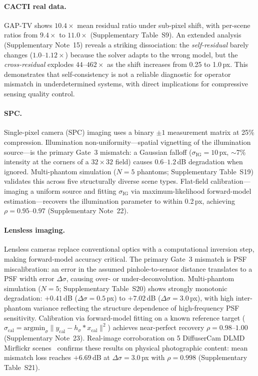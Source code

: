\documentclass[11pt]{article}
\newcommand{\recoveryratio}{\rho}
\begin{document}
\paragraph{CACTI real data.}
GAP-TV shows $10.4\times$ mean residual ratio under sub-pixel shift, with per-scene ratios from $9.4\times$ to $11.0\times$ (Supplementary Table~S9). An extended analysis (Supplementary Note~15) reveals a striking dissociation: the \emph{self-residual} barely changes ($1.0$--$1.12\times$) because the solver adapts to the wrong model, but the \emph{cross-residual} explodes $44$--$462\times$ as the shift increases from 0.25 to 1.0\,px. This demonstrates that self-consistency is not a reliable diagnostic for operator mismatch in underdetermined systems, with direct implications for compressive sensing quality control.

\paragraph{SPC.}
Single-pixel camera (SPC) imaging uses a binary $\pm 1$ measurement matrix at 25\% compression. Illumination non-uniformity---spatial vignetting of the illumination source---is the primary Gate~3 mismatch: a Gaussian falloff ($\sigma_\mathrm{IG}{=}10$\,px, $\sim$7\% intensity at the corners of a $32{\times}32$ field) causes $0.6$--$1.2$\,dB degradation when ignored. Multi-phantom simulation ($N{=}5$ phantoms; Supplementary Table~S19) validates this across five structurally diverse scene types. Flat-field calibration---imaging a uniform source and fitting $\sigma_\mathrm{IG}$ via maximum-likelihood forward-model estimation---recovers the illumination parameter to within 0.2\,px, achieving $\recoveryratio{=}0.95$--$0.97$ (Supplementary Note~22).

\paragraph{Lensless imaging.}
Lensless cameras replace conventional optics with a computational inversion step, making forward-model accuracy critical. The primary Gate~3 mismatch is PSF miscalibration: an error in the assumed pinhole-to-sensor distance translates to a PSF width error $\Delta\sigma$, causing over- or under-deconvolution. Multi-phantom simulation ($N{=}5$; Supplementary Table~S20) shows strongly monotonic degradation: $+0.41$\,dB ($\Delta\sigma{=}0.5$\,px) to $+7.02$\,dB ($\Delta\sigma{=}3.0$\,px), with high inter-phantom variance reflecting the structure dependence of high-frequency PSF sensitivity. Calibration via forward-model fitting on a known reference target ($\sigma_\mathrm{cal} = \mathrm{argmin}_\sigma \|y_\mathrm{cal} - h_\sigma * x_\mathrm{cal}\|^2$) achieves near-perfect recovery $\recoveryratio{=}0.98$--$1.00$ (Supplementary Note~23). Real-image corroboration on 5 DiffuserCam DLMD Mirflickr scenes~\cite{Antipa2018} confirms these results on physical photographic content: mean mismatch loss reaches $+6.69$\,dB at $\Delta\sigma{=}3.0$\,px with $\recoveryratio{=}0.998$ (Supplementary Table~S21).
\end{document}
